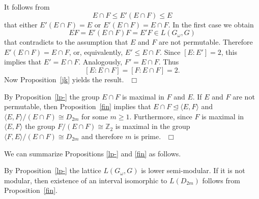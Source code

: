 \documentclass{amsart}
\begin{document}
It follows from $$E\cap F\leq E'(E\cap F)\leq E$$ that either $E'(E\cap F)=E$ or $E'(E\cap F)=E\cap F$.
In the first case we obtain $$EF = E'(E\cap F)F=E'F\in L(G_\omega,G)$$ that contradicts to the assumption that $E$ and $F$
are not permutable. Therefore $E' (E\cap F) = E\cap F$, or, equivalently, $E'\leq E\cap F$.
Since $[E:E']=2$, this implies that $E'=E\cap F$. Analogously, $F'=E\cap F$.
Thus $$[E:E\cap F] =[F:E\cap F] =2.$$ Now
Proposition~\ref{jk} yields the result.
{$\ \ \Box$ \vskip 0.2cm}

{}  By Proposition~\ref{lp-} the group $E\cap F$ is maximal in $F$ and $E$. If $E$ and $F$ are
not permutable, then Proposition~\ref{fin} implies that $E\cap F{\trianglelefteq}{\langle{{E,F}}\rangle}$
and ${\langle{{E,F}}\rangle}/(E\cap F)\cong D_{2m}$ for some $m\geq 1$.
Furthermore, since $F$ is maximal in ${\langle{{E,F}}\rangle}$ the group
$F/(E\cap F)\cong {{\mathbb Z}}_2$ is maximal in the group ${\langle{{F,E}}\rangle}/(E\cap F)\cong D_{2m}$ and therefore $m$ is prime.
{$\ \ \Box$ \vskip 0.2cm}

We can summarize Propositions \ref{lp-} and \ref{fin} as follows.


{} By Proposition~\ref{lp-} the lattice $L(G_\omega,G)$ is lower semi-modular.
If it is not modular, then existence of an interval isomorphic to $L(D_{2m})$ follows
from Proposition~\ref{fin}.

\end{document}

